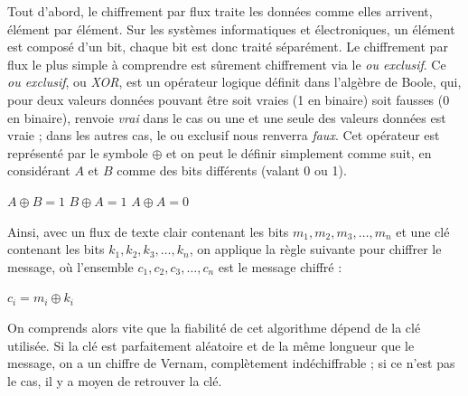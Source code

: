 \label{syst:XOR}
Tout d'abord, le chiffrement par flux traite les données comme elles
arrivent, élément par élément. Sur les systèmes informatiques et
électroniques, un élément est composé d'un bit, chaque bit est donc
traité séparément. Le chiffrement par flux le plus simple à comprendre
est sûrement chiffrement via le \emph{ou exclusif}. Ce \emph{ou
  exclusif}, ou \emph{XOR}, est un opérateur logique définit dans
l'algèbre de Boole, qui, pour deux valeurs données pouvant être soit
vraies (1 en binaire) soit fausses (0 en binaire), renvoie \emph{vrai}
dans le cas ou une et une seule des valeurs données est vraie ; dans
les autres cas, le ou exclusif nous renverra \emph{faux}. Cet
opérateur est représenté par le symbole $\oplus$ et on peut le définir
simplement comme suit, en considérant $A$ et $B$ comme des bits
différents (valant 0
ou 1).
\begin{center}
  $A \oplus B = 1$ \hspace{1.5cm} $B \oplus A = 1$ \hspace{1.5cm} $A
\oplus A = 0$ 
\end{center} 

Ainsi, avec un flux de texte clair contenant les bits $m_1,
m_2, m_3, \dots, m_n$ et une clé contenant les bits $k_1, k_2, k_3,
\dots, k_n$, on applique la règle suivante pour chiffrer le message,
où l'ensemble $c_1, c_2, c_3, \dots, c_n$ est le message chiffré :
\begin{center}
$c_i = m_i \oplus k_i$
\end{center}

On comprends alors vite que la fiabilité de cet algorithme dépend de
la clé utilisée. Si la clé est parfaitement aléatoire et de la
même longueur que le message, on a un chiffre de Vernam, complètement
indéchiffrable ; si ce n'est pas le cas, il y a moyen de retrouver la
clé.



